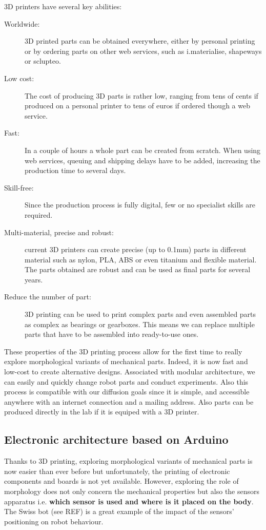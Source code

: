 3D printers have several key abilities:
\begin{description}
    \item[Worldwide:] 3D printed parts can be obtained everywhere, either by personal printing or by ordering parts on other web services, such as i.materialise, shapeways or sclupteo.
    \item[Low cost:] The cost of producing 3D parts is rather low, ranging from tens of cents if produced on a personal printer to tens of euros if ordered though a web service.
    \item[Fast:] In a couple of hours a whole part can be created from scratch. When using web services, queuing and shipping delays have to be added, increasing the production time to several days.
    \item[Skill-free:] Since the production process is fully digital, few or no specialist skills are required.
    \item[Multi-material, precise and robust:] current 3D printers can create precise (up to 0.1mm) parts in different material such as nylon, PLA, ABS or even titanium and flexible material. The parts obtained are robust and can be used as final parts for several years.
    \item[Reduce the number of part:] 3D printing  can be used to print complex parts and even assembled parts as complex as bearings or gearboxes. This means we can replace multiple parts that have to be assembled into ready-to-use ones.
\end{description}

These properties of the 3D printing process allow for the first time to really explore morphological variants of mechanical parts. Indeed, it is now fast and low-cost to create alternative designs. Associated with modular architecture, we can easily and quickly change robot parts and conduct experiments. Also this process is compatible with our diffusion goals since it is simple, and accessible anywhere with an internet connection and a mailing address. Also parts can be produced directly in the lab if it is equiped with a 3D printer.


\subsection{Electronic architecture based on Arduino} %

Thanks to 3D printing, exploring morphological variants of mechanical parts is now easier than ever before but unfortunately, the printing of electronic components and boards is not yet available. However, exploring the role of morphology does not only concern the mechanical properties but also the sensors apparatus i.e. \textbf{which sensor is used and where is it placed on the body}. The Swiss bot (see REF) is a great example of the impact of the sensors’ positioning on robot behaviour.

